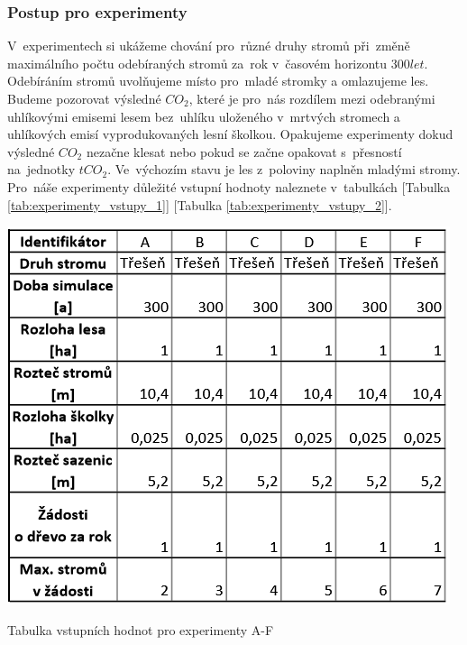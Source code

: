 \documentclass[a4paper, 11pt, titlepage]{article}
\begin{document}
\newpage
\subsubsection{Postup pro experimenty}

V~experimentech si ukážeme chování pro~různé druhy stromů při~změně maximálního počtu odebíraných stromů za~rok v~časovém horizontu $300let$. Odebíráním stromů uvolňujeme místo pro~mladé stromky a omlazujeme les. Budeme pozorovat výsledné $CO_2$, které je pro~nás rozdílem mezi odebranými uhlíkovými emisemi lesem bez~uhlíku uloženého v~mrtvých stromech a uhlíkových emisí vyprodukovaných lesní školkou. Opakujeme experimenty dokud výsledné $CO_2$ nezačne klesat nebo pokud se začne opakovat s~přesností na~jednotky $tCO_2$. Ve~výchozím stavu je les z~poloviny naplněn mladými stromy. Pro~náše experimenty důležité vstupní hodnoty naleznete v~tabulkách [Tabulka \ref{tab:experimenty_vstupy_1}] [Tabulka \ref{tab:experimenty_vstupy_2}].

\begin{table}[htb!]
    \centering
    \includegraphics[scale=1]{assets/tab_e_A_F_in.PNG}
    \caption{Tabulka vstupních hodnot pro experimenty A-F}
    \label{tab:experimenty_vstupy_1}
\end{table}
\end{document}
